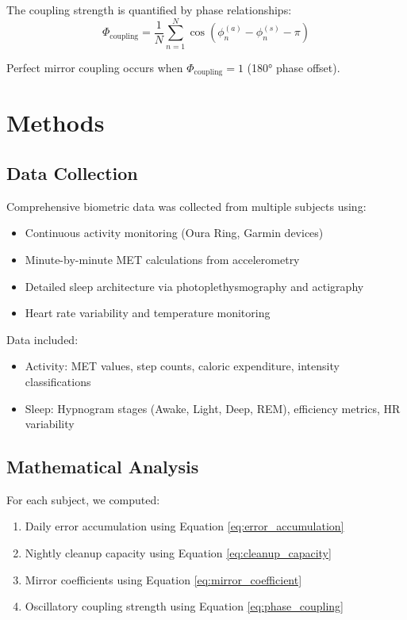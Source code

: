 \documentclass[12pt]{article}
\begin{document}
The coupling strength is quantified by phase relationships:
\begin{equation}
\Phi_{\text{coupling}} = \frac{1}{N} \sum_{n=1}^{N} \cos(\phi_n^{(a)} - \phi_n^{(s)} - \pi)
\label{eq:phase_coupling}
\end{equation}

Perfect mirror coupling occurs when $\Phi_{\text{coupling}} = 1$ (180° phase offset).

\section{Methods}

\subsection{Data Collection}

Comprehensive biometric data was collected from multiple subjects using:
\begin{itemize}
\item Continuous activity monitoring (Oura Ring, Garmin devices)
\item Minute-by-minute MET calculations from accelerometry
\item Detailed sleep architecture via photoplethysmography and actigraphy
\item Heart rate variability and temperature monitoring
\end{itemize}

Data included:
\begin{itemize}
\item Activity: MET values, step counts, caloric expenditure, intensity classifications
\item Sleep: Hypnogram stages (Awake, Light, Deep, REM), efficiency metrics, HR variability
\end{itemize}

\subsection{Mathematical Analysis}

For each subject, we computed:
\begin{enumerate}
\item Daily error accumulation using Equation \ref{eq:error_accumulation}
\item Nightly cleanup capacity using Equation \ref{eq:cleanup_capacity}
\item Mirror coefficients using Equation \ref{eq:mirror_coefficient}
\item Oscillatory coupling strength using Equation \ref{eq:phase_coupling}
\end{enumerate}
\end{document}
